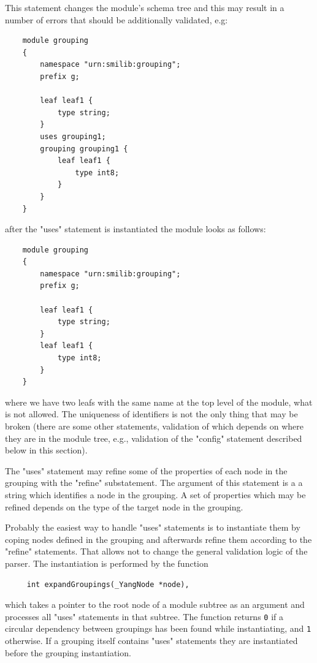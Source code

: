 \documentclass[conference]{IEEEtran}
\begin{document}
This statement changes the module's schema tree and this may result in a number of errors that should be additionally validated, e.g:   
\small
\begin{verbatim}
    module grouping 
    {
        namespace "urn:smilib:grouping";
        prefix g;

        leaf leaf1 {
            type string;
        }
        uses grouping1; 
        grouping grouping1 {
            leaf leaf1 {
                type int8;
            }
        }
    }
\end{verbatim}
\normalsize
after the "uses" statement is instantiated the module looks as follows:
\small
\begin{verbatim}
    module grouping 
    {
        namespace "urn:smilib:grouping";
        prefix g;

        leaf leaf1 {
            type string;
        }
        leaf leaf1 {
            type int8;
        }
    }
\end{verbatim}
\normalsize
where we have two leafs with the same name at the top level of the module, what is not allowed. The uniqueness of identifiers is not the only thing that may be 
broken (there are some other statements, validation of which depends on where they are in the module tree, e.g., validation of the "config" statement described below in this section).

The "uses" statement may refine some of the properties of each node in the grouping with the "refine" substatement.  The argument of this statement is a a string which
identifies a node in the grouping. A set of properties which may be refined depends on the type of the target node in the grouping.

Probably the easiest way to handle "uses" statements is to instantiate them by coping nodes defined in the grouping and afterwards refine them according to
the "refine" statements. That allows not to change the general validation logic of the parser. The instantiation is performed by the function
\small
\begin{verbatim}
     int expandGroupings(_YangNode *node),
\end{verbatim}
\normalsize
which takes a pointer to the root node of a module subtree as an argument and processes all "uses" statements in that subtree. 
The function returns \texttt{0} if a circular dependency between groupings has been found while instantiating, and \texttt{1} otherwise.  
If a grouping itself contains "uses" statements they are instantiated before the grouping instantiation.  
\end{document}
